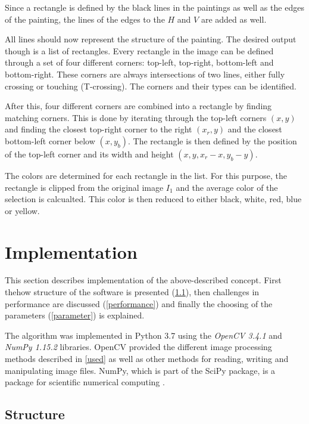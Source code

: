 \documentclass[serif,article,noparskip]{agse-thesis}
\begin{document}
Since a rectangle is defined by the black lines in the paintings as well as the
edges of the painting, the lines of the edges to the $H$ and $V$ are added as
well.

All lines should now represent the structure of the painting. The desired output
though is a list of rectangles. Every rectangle in the image can be defined
through a set of four different corners: top-left, top-right, bottom-left and
bottom-right. These corners are always intersections of two lines, either fully
crossing or touching (T-crossing). The corners and their types can be
identified.

After this, four different corners are combined into a rectangle by finding
matching corners. This is done by iterating through the top-left corners $(x,y)$
and finding the closest top-right corner to the right $(x_r, y)$ and the
closest bottom-left corner below $(x, y_b)$. The rectangle is then defined by
the position of the top-left corner and its width and height
$(x,y,x_r-x,y_b-y)$.

The colors are determined for each rectangle in the list. For this purpose, the
rectangle is clipped from the original image $I_1$ and the average color of the
selection is calcualted. This color is then reduced to either black, white, red,
blue or yellow.

\section{Implementation} \label{implementation}

This section describes implementation of the above-described concept. First
thehow structure of the software is presented (\ref{structure}), then challenges
in performance are discussed (\ref{performance}) and finally the choosing of the
parameters (\ref{parameter}) is explained.

The algorithm was implemented in Python 3.7 using the \textit{OpenCV 3.4.1} and
\textit{NumPy 1.15.2} libraries. OpenCV provided the different image processing
methods described in \ref{used} as well as other methods for reading, writing
and manipulating image files. NumPy, which is part of the SciPy package, is a
package for scientific numerical computing \cite{scipy}.

\subsection{Structure} \label{structure}
\end{document}
